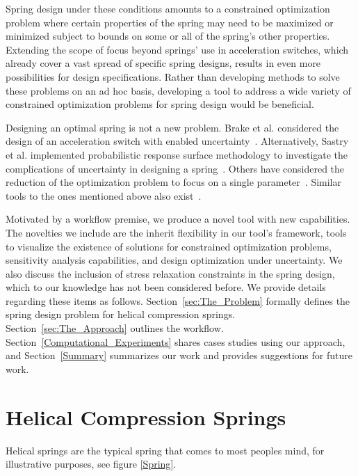 \documentclass[10pt]{article}
\begin{document}
Spring design under these conditions amounts to a constrained optimization problem where certain properties of the spring may need to be maximized or minimized subject to bounds on some or all of the spring's other properties. Extending the scope of focus beyond springs' use in acceleration switches, which already cover a vast spread of specific spring designs, results in even more possibilities for design specifications. Rather than developing methods to solve these problems on an ad hoc basis, developing a tool to address a wide variety of constrained optimization problems for spring design would be beneficial. 

Designing an optimal spring is not a new problem. Brake et al. considered the design of an acceleration switch with enabled uncertainty~\cite{IMSM2010}. Alternatively, Sastry et al. implemented probabilistic response surface methodology to investigate the complications of uncertainty in designing a spring~\cite{Reliability}. Others have considered the reduction of the optimization problem to focus on a single parameter~\cite{Robust}. Similar tools to the ones mentioned above also exist~\cite{Paredes}.

Motivated by a workflow premise, we produce a novel tool with new capabilities. The novelties we include are the inherit flexibility in our tool's framework, tools to visualize the existence of solutions for constrained optimization problems, sensitivity analysis capabilities, and design optimization under uncertainty. We also discuss the inclusion of stress relaxation constraints in the spring design, which to our knowledge has not been considered before. We provide details regarding these items as follows. Section~\ref{sec:The_Problem} formally defines the spring design problem for helical compression springs. Section~\ref{sec:The_Approach} outlines the workflow. Section~\ref{Computational_Experiments} shares cases studies using our approach, and Section~\ref{Summary} summarizes our work and provides suggestions for future work.

\section{Helical Compression Springs}
\label{sec:Springs}

Helical springs are the typical spring that comes to most peoples mind, for illustrative purposes, see figure \ref{Spring}. 
\end{document}
